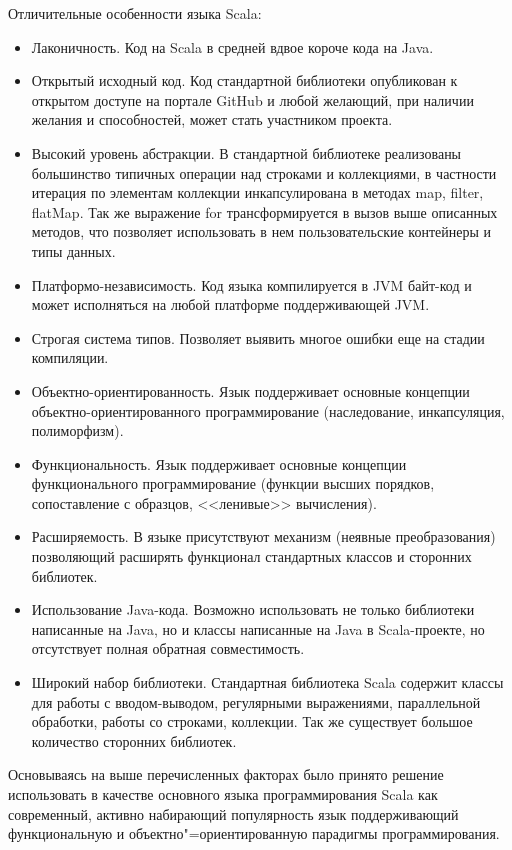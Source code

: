 Отличительные особенности языка Scala:
\begin{itemize}
  \item Лаконичность. Код на Scala в средней вдвое короче кода на Java.
  \item Открытый исходный код. Код стандартной библиотеки опубликован к открытом доступе на портале GitHub и любой желающий, при наличии желания и способностей, может стать участником проекта.
  \item Высокий уровень абстракции. В стандартной библиотеке реализованы большинство типичных операции над строками и коллекциями, в частности итерация по элементам коллекции инкапсулирована в методах map, filter, flatMap. Так же выражение for трансформируется в вызов выше описанных методов, что позволяет использовать в нем пользовательские контейнеры и типы данных. 
  \item Платформо-независимость. Код языка компилируется в JVM байт-код и может исполняться на любой платформе поддерживающей JVM.
  \item Строгая система типов. Позволяет выявить многое ошибки еще на стадии компиляции.
  \item Объектно-ориентированность. Язык поддерживает основные концепции объектно-ориентированного программирование (наследование, инкапсуляция, полиморфизм).
  \item Функциональность. Язык поддерживает основные концепции функционального программирование (функции высших порядков, сопоставление с образцов, <<ленивые>> вычисления).
  \item Расширяемость. В языке присутствуют механизм (неявные преобразования) позволяющий расширять функционал стандартных классов и сторонних библиотек.
  \item Использование Java-кода. Возможно использовать не только библиотеки написанные на Java, но и классы написанные на Java в Scala-проекте, но отсутствует полная обратная совместимость.
  \item Широкий набор библиотеки. Стандартная библиотека Scala содержит классы для работы с вводом-выводом, регулярными выражениями, параллельной обработки, работы со строками, коллекции. Так же существует большое количество сторонних библиотек.
\end{itemize}

Основываясь на выше перечисленных факторах было принято решение использовать в качестве основного языка программирования Scala как современный, активно набирающий популярность язык поддерживающий функциональную и объектно"=ориентированную парадигмы программирования.

